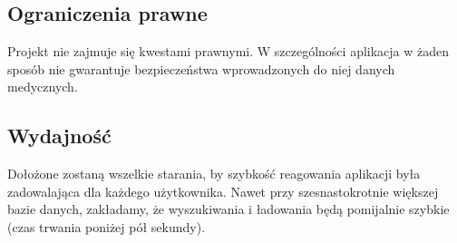 \documentclass[10pt, a4paper]{article}
\begin{document}
\subsection{Ograniczenia prawne}
Projekt nie zajmuje się kwestami prawnymi. W szczególności aplikacja w żaden sposób nie gwarantuje bezpieczeństwa wprowadzonych do niej danych medycznych.
\subsection{Wydajność}
Dołożone zostaną wszelkie starania, by szybkość reagowania aplikacji była zadowalająca dla każdego użytkownika. Nawet przy szesnastokrotnie większej bazie danych, zakładamy, że wyszukiwania i ładowania będą pomijalnie szybkie (czas trwania poniżej pół sekundy).
\end{document}
